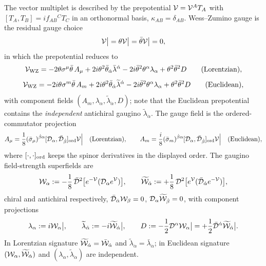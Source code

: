 The vector multiplet is described by the prepotential $\mathcal{V}=\mathcal{V}^AT_A$ with
$[T_A,T_B]=if_{AB}{}^CT_C$ in an orthonormal basis,
$\kappa_{AB}=\delta_{AB}$. Wess--Zumino gauge is the residual gauge choice
\begin{equation}
\mathcal{V}\big|=\theta\mathcal{V}\big|=\bar\theta\mathcal{V}\big|=0 ,
\label{eq:2:wzcondition}
\end{equation}
in which the prepotential reduces to
\begin{equation}
\mathcal{V}_{\rm WZ}=-2\theta\sigma^\mu\bar\theta\,A_\mu
+2i\theta^2\bar\theta_{\dot\alpha}\bar\lambda^{\dot\alpha}
-2i\bar\theta^2\theta^\alpha\lambda_\alpha
+\theta^2\bar\theta^2 D
\qquad\text{(Lorentzian)},
\label{eq:2:wzL}
\end{equation}
\begin{equation}
\mathcal{V}_{\rm WZ}=-2i\theta\sigma^m\bar\theta\,A_m
+2i\theta^2\bar\theta_{\dot\alpha}\widetilde\lambda^{\dot\alpha}
-2i\bar\theta^2\theta^\alpha\lambda_\alpha
+\theta^2\bar\theta^2 D
\qquad\text{(Euclidean)},
\label{eq:2:wzE}
\end{equation}
with component fields $(A_m,\lambda_\alpha,\widetilde\lambda_{\dot\alpha},D)$;
note that the Euclidean prepotential contains the \emph{independent}
antichiral gaugino $\widetilde\lambda_{\dot\alpha}$. The gauge field is the
ordered-commutator projection
\begin{equation}
A_\mu=\frac18(\bar\sigma_\mu)^{\dot\beta\alpha}
[\mathcal{D}_\alpha,\bar{\mathcal{D}}_{\dot\beta}]_{\rm ord}\mathcal{V}\Big|
\quad\text{(Lorentzian)},\qquad
A_m=\frac{i}{8}(\bar\sigma_m)^{\dot\beta\alpha}
[\mathcal{D}_\alpha,\bar{\mathcal{D}}_{\dot\beta}]_{\rm ord}\mathcal{V}\Big|
\quad\text{(Euclidean)},
\label{eq:2:Aprojection}
\end{equation}
where $[\cdot,\cdot]_{\rm ord}$ keeps the spinor derivatives in the displayed
order. The gaugino field-strength superfields are
\begin{equation}
\mathcal{W}_\alpha:=-\frac18\,\bar{\mathcal{D}}^2\big[e^{-\mathcal{V}}(\mathcal{D}_\alpha e^{\mathcal{V}})\big],\qquad
\widetilde{\mathcal{W}}_{\dot\alpha}
:=+\frac18\,\mathcal{D}^2\big[e^{\mathcal{V}}(\bar{\mathcal{D}}_{\dot\alpha}e^{-\mathcal{V}})\big],
\label{eq:2:fieldstrengths}
\end{equation}
chiral and antichiral respectively, $\bar{\mathcal{D}}_{\dot\alpha}\mathcal{W}_\beta=0$,
$\mathcal{D}_\alpha\widetilde{\mathcal{W}}_{\dot\beta}=0$, with component projections
\begin{equation}
\lambda_\alpha:=i\mathcal{W}_\alpha\big|,\qquad
\widetilde\lambda_{\dot\alpha}:=-i\widetilde{\mathcal{W}}_{\dot\alpha}\big|,\qquad
D:=-\frac12\mathcal{D}^\alpha\mathcal{W}_\alpha\big|
=+\frac12\bar{\mathcal{D}}^{\dot\alpha}\widetilde{\mathcal{W}}_{\dot\alpha}\big| .
\label{eq:2:vectorcomponents}
\end{equation}
In Lorentzian signature $\widetilde{\mathcal{W}}_{\dot\alpha}=\bar{\mathcal{W}}_{\dot\alpha}$ and
$\widetilde\lambda_{\dot\alpha}=\bar\lambda_{\dot\alpha}$; in Euclidean
signature $(\mathcal{W}_\alpha,\widetilde{\mathcal{W}}_{\dot\alpha})$ and
$(\lambda_\alpha,\widetilde\lambda_{\dot\alpha})$ are independent.

